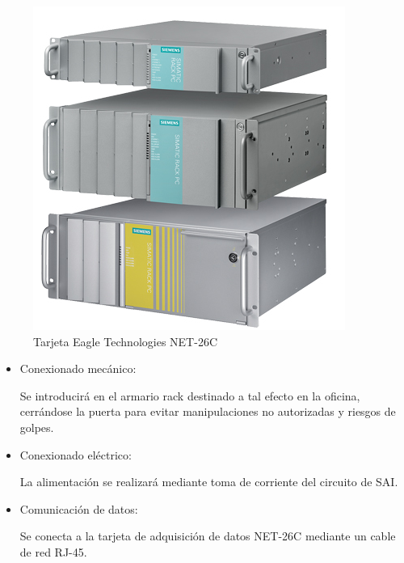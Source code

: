 	\begin{figure}[htp]
			\centering
			\includegraphics[scale=0.4]{Datasheets/12Foto.png}
			\caption{Tarjeta Eagle Technologies NET-26C}
			\label{fig:testa}
	\end{figure}
	

		\begin{itemize}
				\item{Conexionado mecánico:}
				
				Se introducirá en el armario rack destinado a tal efecto en la oficina, cerrándose la puerta para evitar manipulaciones no autorizadas y riesgos de golpes.

				\item{Conexionado eléctrico:}
				
				La alimentación se realizará mediante toma de corriente del circuito de SAI.

				\item{Comunicación de datos:}
				
				Se conecta a la tarjeta de adquisición de datos NET-26C mediante un cable de red RJ-45.
		\end{itemize}

\newpage


